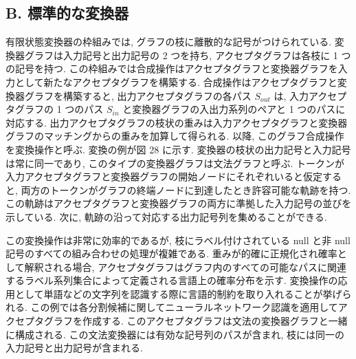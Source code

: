 \documentclass[twocolumn]{jarticle}     %
\begin{document}
\subsection{B. 標準的な変換器}

有限状態変換器の枠組みでは, グラフの枝に離散的な記号がつけられている. 変換器グラフは入力記号と出力記号の 2 つを持ち, アクセプタグラフは各枝に 1 つの記号を持つ. この枠組みでは合成操作はアクセプタグラフと変換器グラフを入力として新たなアクセプタグラフを構築する.
合成操作はアクセプタグラフと変換器グラフを構築すると, 出力アクセプタグラフの各パス $S_{out}$ は, 入力アクセプタグラフの 1 つのパス $S_{in}$ と変換器グラフの入出力系列のペアと 1 つのパスに対応する. 
出力アクセプタグラフの枝状の重みは入力アクセプタグラフと変換器グラフのマッチングからの重みを加算して得られる. 
以降, このグラフ合成操作を変換操作と呼ぶ. 
変換の例が図 28 に示す. 変換器の枝状の出力記号と入力記号は常に同一であり, このタイプの変換器グラフは文法グラフと呼ぶ.
トークンが入力アクセプタグラフと変換器グラフの開始ノードにそれぞれいると仮定すると, 両方のトークンがグラフの終端ノードに到達したとき許容可能な軌跡を持つ. 
この軌跡はアクセプタグラフと変換器グラフの両方に準拠した入力記号の並びを示している. 次に, 軌跡の沿って対応する出力記号列を集めることができる.
\par
この変換操作は非常に効率的であるが, 枝にラベル付けされている null と非 null 記号のすべての組み合わせの処理が複雑である. 重みが的確に正規化され確率として解釈される場合, アクセプタグラフはグラフ内のすべての可能なパスに関連するラベル系列集合によって定義される言語上の確率分布を示す.
変換操作の応用として単語などの文字列を認識する際に言語的制約を取り入れることが挙げられる. この例では各分割候補に関してニューラルネットワーク認識を適用してアクセプタグラフを作成する. このアクセプタグラフは文法の変換器グラフと一緒に構成される. この文法変換器には有効な記号列のパスが含まれ, 枝には同一の入力記号と出力記号が含まれる. 
\end{document}
